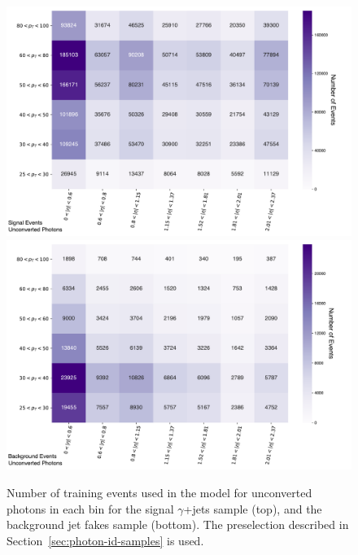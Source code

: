 \begin{figure}[!hp]
    \centering
    \includegraphics[width=.85\textwidth]{chapters/chapter4_photonID/images/sig_events.pdf}
    \includegraphics[width=.85\textwidth]{chapters/chapter4_photonID/images/bkg_events.pdf}
    \caption[Number of training events used in the model for unconverted photons in each \etaPt bin for the signal $\gamma$+jets sample, and the background jet fakes sample]{Number of training events used in the model for unconverted photons in each \etaPt bin for the signal $\gamma$+jets sample (top), and the background jet fakes sample (bottom). The preselection described in Section~\ref{sec:photon-id-samples} is used.}
    \label{fig:photonid-events}
\end{figure}

